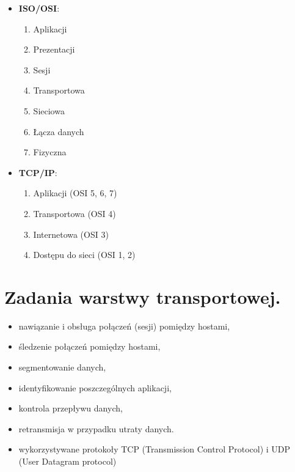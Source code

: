 \documentclass[12pt,a4paper]{article}
\begin{document}
	\begin{multicols}{2}
		\begin{itemize}
			\item \textbf{ISO/OSI}:
			\begin{enumerate}
				\item Aplikacji
				\item Prezentacji
				\item Sesji
				\item Transportowa
				\item Sieciowa
				\item Łącza danych
				\item Fizyczna	
			\end{enumerate}
		
			\columnbreak
			
			\item \textbf{TCP/IP}:
			\begin{enumerate}
				\item Aplikacji (OSI 5, 6, 7)
				\item Transportowa (OSI 4)
				\item Internetowa (OSI 3)
				\item Dostępu do sieci (OSI 1, 2)
			\end{enumerate}
		
			\vfill\null
		\end{itemize}
	\end{multicols}
	
	\section{Zadania warstwy transportowej.}
	\begin{itemize}
		\item nawiązanie i obsługa połączeń (sesji) pomiędzy hostami,
		\item śledzenie połączeń pomiędzy hostami,
		\item segmentowanie danych,
		\item identyfikowanie poszczególnych aplikacji,
		\item kontrola przepływu danych,
		\item retransmisja w przypadku utraty danych.
		\item wykorzystywane protokoły TCP (Transmission Control Protocol) i UDP (User Datagram protocol)
	\end{itemize}
\end{document}
